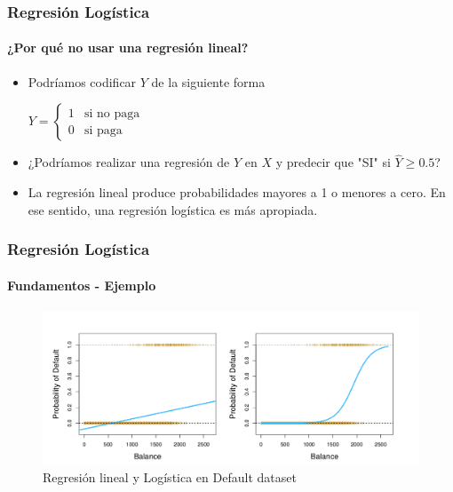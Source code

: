 \documentclass{beamer}
\begin{document}
\begin{frame}
	\frametitle{Regresión Logística}
	\framesubtitle{¿Por qué no usar una regresión lineal?}
	\begin{itemize}
		\item Podríamos codificar $Y$ de la siguiente forma \linebreak
		
			 $
			 Y = 
				\begin{cases} 
				1 & \text{si no paga } \\
				0 & \text{si paga}
				\end{cases} 
				$
		\item ¿Podríamos realizar una regresión de $Y$ en $X$ y predecir que "SI" si $\hat{Y} \geq 0.5$?
		\item La regresión lineal produce probabilidades mayores a 1 o menores a cero. En ese sentido, una regresión logística es más apropiada.
	\end{itemize}
\end{frame}



\begin{frame}
\frametitle{Regresión Logística}
\framesubtitle{Fundamentos - Ejemplo}
\begin{figure}[H]	
	\centering
	\includegraphics[width=1\linewidth, height=0.6\textheight]{./img/02}
	\caption{Regresión lineal y Logística en Default dataset \cite{hastie02}}
\end{figure}
\end{frame}
\end{document}
